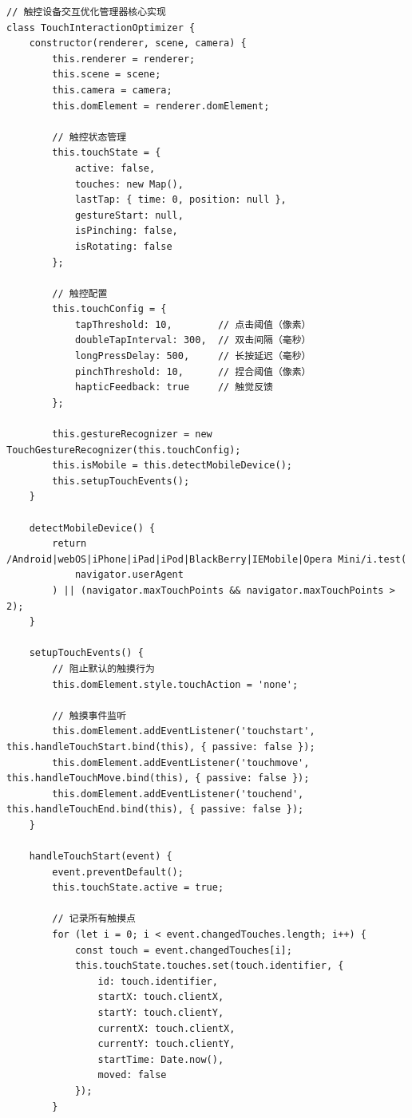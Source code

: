 \begin{lstlisting}[style=javascript]
// 触控设备交互优化管理器核心实现
class TouchInteractionOptimizer {
    constructor(renderer, scene, camera) {
        this.renderer = renderer;
        this.scene = scene;
        this.camera = camera;
        this.domElement = renderer.domElement;
        
        // 触控状态管理
        this.touchState = {
            active: false,
            touches: new Map(),
            lastTap: { time: 0, position: null },
            gestureStart: null,
            isPinching: false,
            isRotating: false
        };
        
        // 触控配置
        this.touchConfig = {
            tapThreshold: 10,        // 点击阈值（像素）
            doubleTapInterval: 300,  // 双击间隔（毫秒）
            longPressDelay: 500,     // 长按延迟（毫秒）
            pinchThreshold: 10,      // 捏合阈值（像素）
            hapticFeedback: true     // 触觉反馈
        };
        
        this.gestureRecognizer = new TouchGestureRecognizer(this.touchConfig);
        this.isMobile = this.detectMobileDevice();
        this.setupTouchEvents();
    }
    
    detectMobileDevice() {
        return /Android|webOS|iPhone|iPad|iPod|BlackBerry|IEMobile|Opera Mini/i.test(
            navigator.userAgent
        ) || (navigator.maxTouchPoints && navigator.maxTouchPoints > 2);
    }
    
    setupTouchEvents() {
        // 阻止默认的触摸行为
        this.domElement.style.touchAction = 'none';
        
        // 触摸事件监听
        this.domElement.addEventListener('touchstart', this.handleTouchStart.bind(this), { passive: false });
        this.domElement.addEventListener('touchmove', this.handleTouchMove.bind(this), { passive: false });
        this.domElement.addEventListener('touchend', this.handleTouchEnd.bind(this), { passive: false });
    }
    
    handleTouchStart(event) {
        event.preventDefault();
        this.touchState.active = true;
        
        // 记录所有触摸点
        for (let i = 0; i < event.changedTouches.length; i++) {
            const touch = event.changedTouches[i];
            this.touchState.touches.set(touch.identifier, {
                id: touch.identifier,
                startX: touch.clientX,
                startY: touch.clientY,
                currentX: touch.clientX,
                currentY: touch.clientY,
                startTime: Date.now(),
                moved: false
            });
        }
        

\end{lstlisting}
